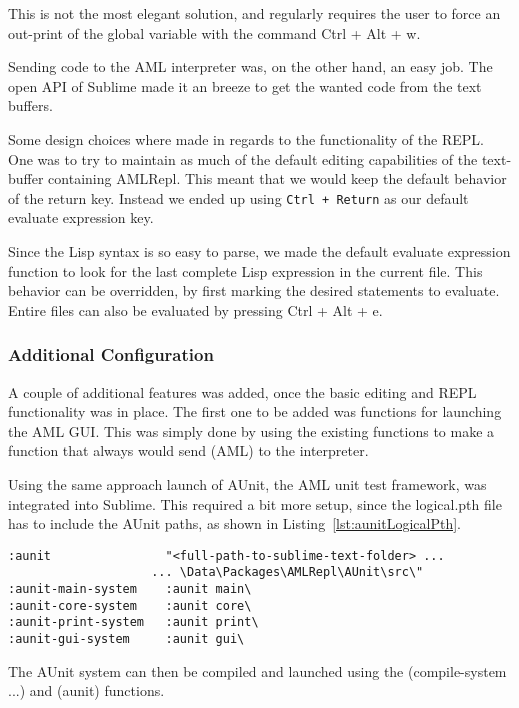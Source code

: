 This is not the most elegant solution, and regularly requires the user to force an out-print of the global variable with the command Ctrl + Alt + w.

Sending code to the AML interpreter was, on the other hand, an easy job. The open API of Sublime made it an breeze to get the wanted code from the text buffers.

Some design choices where made in regards to the functionality of the REPL. One was to try to maintain as much of the default editing capabilities of the text-buffer containing AMLRepl. This meant that we would keep the default behavior of the return key. Instead we ended up using \texttt{Ctrl + Return} as our default evaluate expression key.

Since the Lisp syntax is so easy to parse, we made the default evaluate expression function to look for the last complete Lisp expression in the current file. This behavior can be overridden, by first marking the desired statements to evaluate. Entire files can also be evaluated by pressing Ctrl + Alt + e.

\subsubsection{Additional Configuration} %
\label{ssub:additional_configuration}
A couple of additional features was added, once the basic editing and REPL functionality was in place. The first one to be added was functions for launching the AML GUI. This was simply done by using the existing functions to make a function that always would send (AML) to the interpreter.

Using the same approach launch of AUnit, the AML unit test framework, was integrated into Sublime. This required a bit more setup, since the logical.pth file has to include the AUnit paths, as shown in Listing~\ref{lst:aunitLogicalPth}.

\begin{lstlisting}[caption={Aunit logical path},label={lst:aunitLogicalPth}]
:aunit                "<full-path-to-sublime-text-folder> ...
                    ... \Data\Packages\AMLRepl\AUnit\src\"
:aunit-main-system    :aunit main\
:aunit-core-system    :aunit core\
:aunit-print-system   :aunit print\
:aunit-gui-system     :aunit gui\
\end{lstlisting}

The AUnit system can then be compiled and launched using the (compile-system ...) and (aunit) functions.

